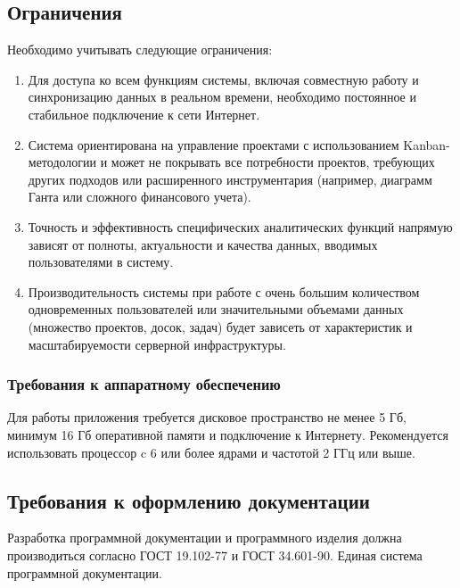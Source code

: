 \subsection{Ограничения}

Необходимо учитывать следующие ограничения:
\begin{enumerate}
	\item Для доступа ко всем функциям системы, включая совместную работу и синхронизацию данных в реальном времени, необходимо постоянное и стабильное подключение к сети Интернет.
	\item Система ориентирована на управление проектами с использованием Kanban-методологии и может не покрывать все потребности проектов, требующих других подходов или расширенного инструментария (например, диаграмм Ганта или сложного финансового учета).
	\item Точность и эффективность специфических аналитических функций напрямую зависят от полноты, актуальности и качества данных, вводимых пользователями в систему.
	\item Производительность системы при работе с очень большим количеством одновременных пользователей или значительными объемами данных (множество проектов, досок, задач) будет зависеть от характеристик и масштабируемости серверной инфраструктуры.
\end{enumerate}

\subsubsection{Требования к аппаратному обеспечению}
Для работы приложения требуется дисковое пространство не менее 5 Гб, минимум 16 Гб оперативной памяти и подключение к Интернету. Рекомендуется использовать процессор c 6 или более ядрами и частотой 2 ГГц или выше.

\subsection{Требования к оформлению документации}

Разработка программной документации и программного изделия должна производиться согласно ГОСТ 19.102-77 и ГОСТ 34.601-90. Единая система программной документации.